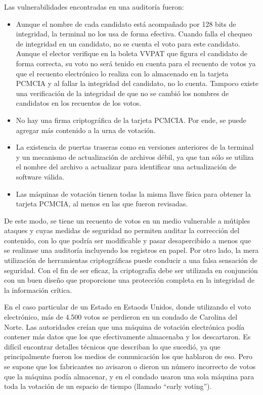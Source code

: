 Las vulnerabilidades encontradas en una auditoría fueron:
\begin{itemize}
	\item Aunque el nombre de cada candidato está acompañado por 128 bits de integridad, la terminal no los usa de forma efectiva. Cuando falla el chequeo de integridad en un candidato, no se cuenta el voto para este candidato. Aunque el elector verifique en la boleta VVPAT que figura el candidato de forma correcta, su voto no será tenido en cuenta para el recuento de votos ya que el recuento electrónico lo realiza con lo almacenado en la tarjeta PCMCIA y al fallar la integridad del candidato, no lo cuenta. Tampoco existe una verificación de la integridad de que no se cambió los nombres de candidatos en los recuentos de los votos.
	\item No hay una firma criptográfica de la tarjeta PCMCIA. Por ende, se puede agregar más contenido a la urna de votación.
	\item La existencia de puertas traseras como en versiones anteriores de la terminal y un mecanismo de actualización de archivos débil, ya que tan sólo se utiliza el nombre del archivo a actualizar para identificar una actualización de software válida.
	\item Las máquinas de votación tienen todas la misma llave física para obtener la tarjeta PCMCIA, al menos en las que fueron revisadas.
\end{itemize}

De este modo, se tiene un recuento de votos en un medio vulnerable a mútiples ataques y cuyas medidas de seguridad no permiten auditar la corrección del contenido, con lo que podría ser modificable y pasar desapercibido a menos que se realizase una auditoría incluyendo los registros en papel. Por otro lado, la mera utilización de herramientas criptográficas puede conducir a una falsa sensación de seguridad. Con el fin de ser eficaz, la criptografía debe ser utilizada en conjunción con un buen diseño que proporcione una protección completa en la integridad de la información crítica.

En el caso particular de un Estado en Estaods Unidos, donde utilizando el voto electrónico, más de 4.500 votos se perdieron en un condado de Carolina del Norte. Las autoridades creían que una máquina de votación electrónica podía contener más datos que los que efectivamente almacenaba\cite{usatoday} y los descartaron. Es difícil encontrar detalles técnicos que describan lo que sucedió, ya que principalmente fueron los medios de comunicación los que hablaron de eso. Pero se supone que los fabricantes no avisaron o dieron un número incorrecto de votos que la máquina podía almacenar, y en el condado usaron una sola máquina para toda la votación de un espacio de tiempo (llamado ``early voting'').

